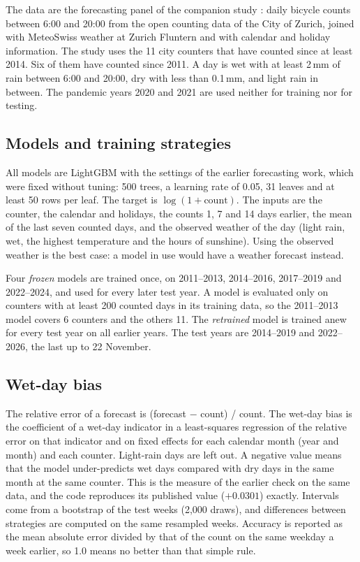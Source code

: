 \documentclass[preprint,12pt,authoryear]{elsarticle}
\begin{document}
The data are the forecasting panel of the companion study \citep{arzimanli2026rain}: daily bicycle counts between 6:00 and 20:00 from the open counting data of the City of Zurich, joined with MeteoSwiss weather at Zurich Fluntern and with calendar and holiday information. The study uses the 11 city counters that have counted since at least 2014. Six of them have counted since 2011. A day is wet with at least 2\,mm of rain between 6:00 and 20:00, dry with less than 0.1\,mm, and light rain in between. The pandemic years 2020 and 2021 are used neither for training nor for testing.

\subsection{Models and training strategies}

All models are LightGBM \citep{ke2017lightgbm} with the settings of the earlier forecasting work, which were fixed without tuning: 500 trees, a learning rate of 0.05, 31 leaves and at least 50 rows per leaf. The target is $\log(1+\text{count})$. The inputs are the counter, the calendar and holidays, the counts 1, 7 and 14 days earlier, the mean of the last seven counted days, and the observed weather of the day (light rain, wet, the highest temperature and the hours of sunshine). Using the observed weather is the best case: a model in use would have a weather forecast instead.

Four \emph{frozen} models are trained once, on 2011--2013, 2014--2016, 2017--2019 and 2022--2024, and used for every later test year. A model is evaluated only on counters with at least 200 counted days in its training data, so the 2011--2013 model covers 6 counters and the others 11. The \emph{retrained} model is trained anew for every test year on all earlier years. The test years are 2014--2019 and 2022--2026, the last up to 22 November.

\subsection{Wet-day bias}

The relative error of a forecast is (forecast $-$ count) / count. The wet-day bias is the coefficient of a wet-day indicator in a least-squares regression of the relative error on that indicator and on fixed effects for each calendar month (year and month) and each counter. Light-rain days are left out. A negative value means that the model under-predicts wet days compared with dry days in the same month at the same counter. This is the measure of the earlier check on the same data, and the code reproduces its published value ($+0.0301$) exactly. Intervals come from a bootstrap of the test weeks (2,000 draws), and differences between strategies are computed on the same resampled weeks. Accuracy is reported as the mean absolute error divided by that of the count on the same weekday a week earlier, so 1.0 means no better than that simple rule.
\end{document}
